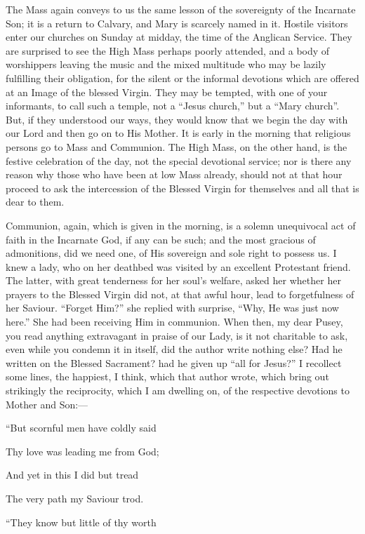 The Mass again conveys to us the same lesson of the sovereignty of
the Incarnate Son; it is a return to Calvary, and Mary is scarcely named
in it. Hostile visitors enter our churches on Sunday at midday, the time
of the Anglican Service. They are surprised to see the High Mass perhaps
poorly attended, and a body of worshippers leaving the music and the
mixed multitude who may be lazily fulfilling their obligation, for the
silent or the informal devotions which are offered at an Image of the
blessed Virgin. They may be tempted, with one of your informants, to
call such a temple, not a ``Jesus church,'' but a ``Mary
church''. But, if they understood our ways, they would know that we
begin the day with our Lord and then go on to His Mother. It is early in
the morning that religious persons go to Mass and Communion. The High
Mass, on the other hand, is the festive celebration of the day, not the
special devotional service; nor is there any reason why those who have
been at low Mass already, should not at that hour proceed to ask the
intercession of the Blessed Virgin for themselves and all that is dear
to them.

Communion, again, which is given in the morning, is a solemn
unequivocal act of faith in the Incarnate God, if any can be such;
and the most gracious of admonitions, did we need one, of His sovereign
and sole right to possess us. I knew a lady, who on her deathbed was
visited by an excellent Protestant friend. The latter, with great
tenderness for her soul's welfare, asked her whether her prayers to the
Blessed Virgin did not, at that awful hour, lead to forgetfulness of her
Saviour. ``Forget Him?'' she replied with surprise, ``Why,
He was just now here.'' She had been receiving Him in communion.
When then, my dear Pusey, you read anything extravagant in praise of our
Lady, is it not charitable to ask, even while you condemn it in itself,
did the author write nothing else? Had he written on the Blessed
Sacrament? had he given up ``all for Jesus?'' I recollect some
lines, the happiest, I think, which that author wrote, which bring out
strikingly the reciprocity, which I am dwelling on, of the respective
devotions to Mother and Son:—

``But scornful men have coldly said

Thy love was leading me from God;

And yet in this I did but tread

The very path my Saviour trod.

``They know but little of thy worth

